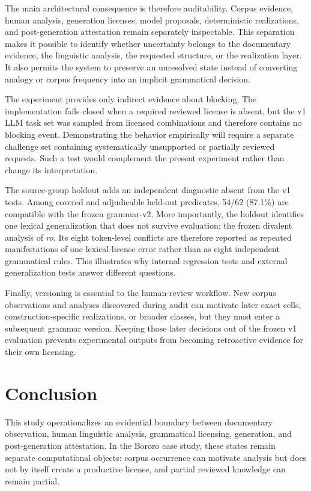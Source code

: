 \documentclass[11pt]{article}
\begin{document}
The main architectural consequence is therefore auditability. Corpus evidence,
human analysis, generation licenses, model proposals, deterministic
realizations, and post-generation attestation remain separately inspectable.
This separation makes it possible to identify whether uncertainty belongs to
the documentary evidence, the linguistic analysis, the requested structure, or
the realization layer. It also permits the system to preserve an unresolved
state instead of converting analogy or corpus frequency into an implicit
grammatical decision.

The experiment provides only indirect evidence about blocking. The
implementation fails closed when a required reviewed license is absent, but the
v1 LLM task set was sampled from licensed combinations and therefore contains
no blocking event. Demonstrating the behavior empirically will require a
separate challenge set containing systematically unsupported or partially
reviewed requests. Such a test would complement the present experiment rather
than change its interpretation.

The source-group holdout adds an independent diagnostic absent from the v1
tests. Among covered and adjudicable held-out predicates, 54/62 (87.1\%) are
compatible with the frozen grammar-v2. More importantly, the holdout identifies
one lexical generalization that does not survive evaluation: the frozen
divalent analysis of \textit{ro}. Its eight token-level conflicts are therefore
reported as repeated manifestations of one lexical-license error rather than as
eight independent grammatical rules. This illustrates why internal regression
tests and external generalization tests answer different questions.

Finally, versioning is essential to the human-review workflow. New corpus
observations and analyses discovered during audit can motivate later exact
cells, construction-specific realizations, or broader classes, but they must
enter a subsequent grammar version. Keeping those later decisions out of the
frozen v1 evaluation prevents experimental outputs from becoming retroactive
evidence for their own licensing.

\section{Conclusion}

This study operationalizes an evidential boundary between documentary
observation, human linguistic analysis, grammatical licensing, generation, and
post-generation attestation. In the Bororo case study, these states remain
separate computational objects: corpus occurrence can motivate analysis but
does not by itself create a productive license, and partial reviewed knowledge
can remain partial.
\end{document}
